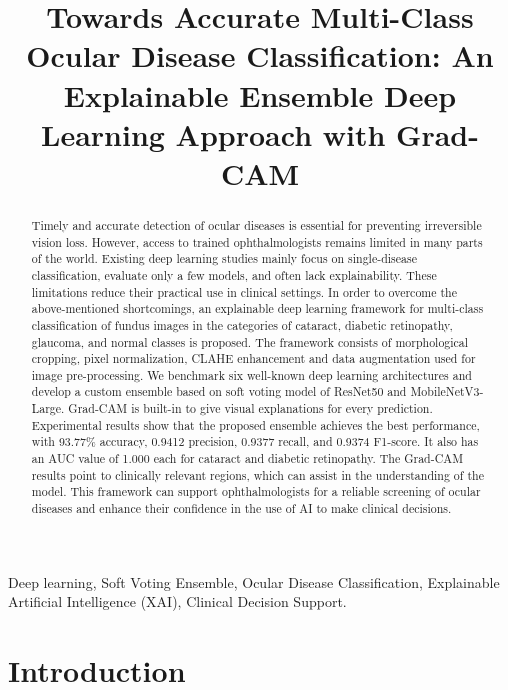 \documentclass[conference]{IEEEtran}
\begin{document}
\title{Towards Accurate Multi-Class Ocular Disease Classification: An Explainable Ensemble Deep Learning Approach with Grad-CAM}

\author{}

\maketitle
\vspace{-3em}

\begin{abstract}
Timely and accurate detection of ocular diseases is essential for preventing irreversible vision loss. However, access to trained ophthalmologists remains limited in many parts of the world. Existing deep learning studies mainly focus on single-disease classification, evaluate only a few models, and often lack explainability. These limitations reduce their practical use in clinical settings. In order to overcome the above-mentioned shortcomings, an explainable deep learning framework for multi-class classification of fundus images in the categories of cataract, diabetic retinopathy, glaucoma, and normal classes is proposed. The framework consists of morphological cropping, pixel normalization, CLAHE enhancement and data augmentation used for image pre-processing. We benchmark six well-known deep learning architectures and develop a custom ensemble based on soft voting model of ResNet50 and MobileNetV3-Large. Grad-CAM is built-in to give visual explanations for every prediction. Experimental results show that the proposed ensemble achieves the best performance, with 93.77\% accuracy, 0.9412 precision, 0.9377 recall, and 0.9374 F1-score. It also has an AUC value of 1.000 each for cataract and diabetic retinopathy. The Grad-CAM results point to clinically relevant regions, which can assist in the understanding of the model. This framework can support ophthalmologists for a reliable screening of ocular diseases and enhance their confidence in the use of AI to make clinical decisions.


\end{abstract}

\begin{IEEEkeywords}
 Deep learning, Soft Voting Ensemble, Ocular Disease Classification, Explainable Artificial Intelligence (XAI), Clinical Decision Support.
\end{IEEEkeywords}

\section{Introduction}
\end{document}

